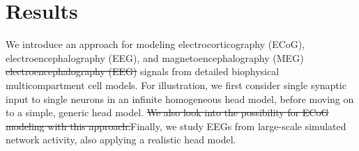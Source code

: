 \documentclass[preprint,10pt,authoryear]{elsarticle}
\newcommand{\hlp}[2][Purple]{ {\sethlcolor{#1} \hl{#2}} }
\newcommand{\tvntxt}[1]{{\color{Emerald}#1}}
\newcommand{\gen}[1]{\color{white}{\hlp{GTE: #1 }}\color{black}}
\begin{document}
\section{Results}\label{sec:results}
\normalsize

We introduce an approach for modeling \tvntxt{electrocorticography (ECoG), electroencephalography (EEG), and magnetoencephalography (MEG) \sout{electroencephalography (EEG)}} signals from detailed biophysical multicompartment cell models. For illustration, we first consider single synaptic input to single neurons in an infinite homogeneous head model, before moving on to a simple, generic head model. \tvntxt{\sout{We also look into the possibility for ECoG modeling with this approach.}}Finally, we study EEGs from \tvntxt{large-scale simulated network} activity, also applying a realistic head model. 


%
\end{document}
